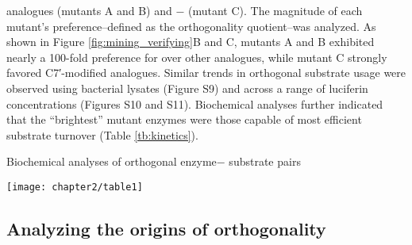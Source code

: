 analogues  (mutants A and B) and − (mutant C). The
magnitude of each mutant’s preference--defined as the
orthogonality quotient--was analyzed. As shown in Figure
\ref{fig:mining_verifying}B and C, mutants A and B exhibited nearly a 100-fold preference for  over other analogues, while mutant C strongly favored C7′-modified analogues. Similar trends in orthogonal substrate
usage were observed using bacterial lysates (Figure S9) and
across a range of luciferin concentrations (Figures S10 and
S11). Biochemical analyses further indicated that the “brightest”
mutant enzymes were those capable of most efficient substrate
turnover (Table \ref{tb:kinetics}).
\begin{table}
  \caption{Biochemical analyses of orthogonal enzyme−
substrate pairs}
\texttt{[image: chapter2/table1]}
\centering
  \label{tb:kinetics}
\end{table}

\subsection*{Analyzing the origins of orthogonality}

